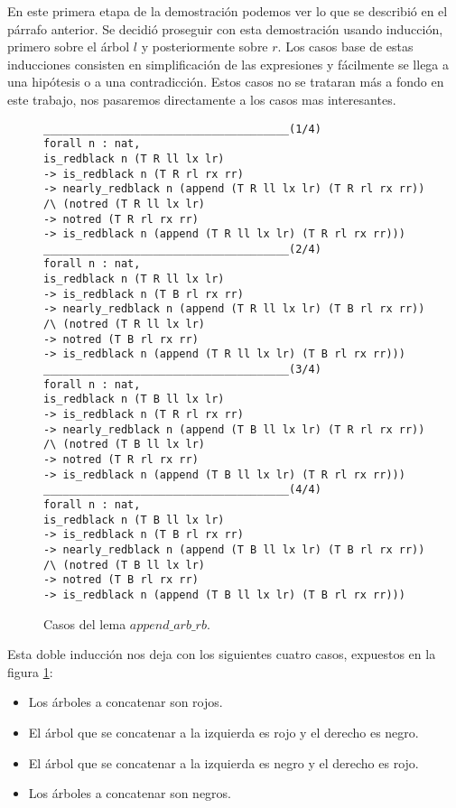 En este primera etapa de la demostraci\'on podemos ver lo que se describió en el párrafo anterior.
Se decidió proseguir con esta demostraci\'on usando inducci\'on, primero sobre el árbol $l$ y
posteriormente sobre $r$. Los casos base de estas inducciones consisten en simplificación de las
expresiones y fácilmente se llega a una hipótesis o a una contradicci\'on. Estos casos no se
trataran m\'as a fondo en este trabajo, nos pasaremos directamente a los casos mas interesantes.



\begin{figure}[!ht]
\centering
\captionsetup{justification=centering}
\begin{verbatim}
______________________________________(1/4)
forall n : nat,
is_redblack n (T R ll lx lr)
-> is_redblack n (T R rl rx rr)
-> nearly_redblack n (append (T R ll lx lr) (T R rl rx rr))
/\ (notred (T R ll lx lr)
-> notred (T R rl rx rr)
-> is_redblack n (append (T R ll lx lr) (T R rl rx rr)))
______________________________________(2/4)
forall n : nat,
is_redblack n (T R ll lx lr)
-> is_redblack n (T B rl rx rr)
-> nearly_redblack n (append (T R ll lx lr) (T B rl rx rr))
/\ (notred (T R ll lx lr)
-> notred (T B rl rx rr)
-> is_redblack n (append (T R ll lx lr) (T B rl rx rr)))
______________________________________(3/4)
forall n : nat,
is_redblack n (T B ll lx lr)
-> is_redblack n (T R rl rx rr)
-> nearly_redblack n (append (T B ll lx lr) (T R rl rx rr))
/\ (notred (T B ll lx lr)
-> notred (T R rl rx rr)
-> is_redblack n (append (T B ll lx lr) (T R rl rx rr)))
______________________________________(4/4)
forall n : nat,
is_redblack n (T B ll lx lr)
-> is_redblack n (T B rl rx rr)
-> nearly_redblack n (append (T B ll lx lr) (T B rl rx rr))
/\ (notred (T B ll lx lr)
-> notred (T B rl rx rr)
-> is_redblack n (append (T B ll lx lr) (T B rl rx rr)))
\end{verbatim}
\caption{Casos del lema $append\_arb\_rb$.}
\label{casos_append}
\end{figure}

Esta doble inducci\'on nos deja con los siguientes cuatro casos, expuestos en la figura \ref{casos_append}:
\begin{itemize}
    \item Los \'arboles a concatenar son rojos.
    \item El \'arbol que se concatenar a la izquierda es rojo y el derecho es negro.
    \item El \'arbol que se concatenar a la izquierda es negro y el derecho es rojo.
    \item Los \'arboles a concatenar son negros.
\end{itemize}

